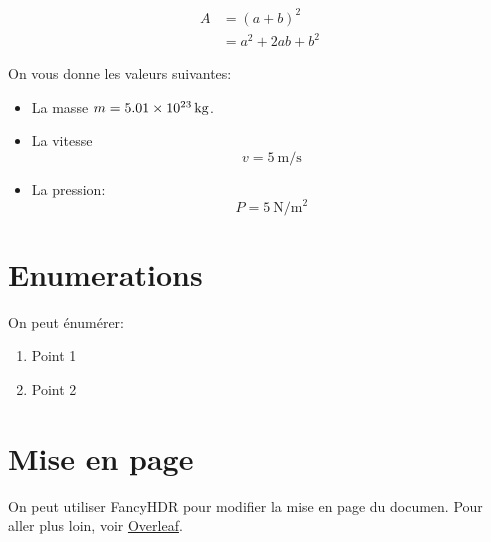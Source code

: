 \documentclass[10pt,a4paper,twoside]{article}
\begin{document}
\begin{align}
    A & = \left( a + b\right)^2 \nonumber \\
      & = a^2 + 2 ab + b^2
\end{align}

On vous donne les valeurs suivantes:
\begin{itemize}
\item La masse $m = \qty{5.01d23}{\kilo\gram}$.
\item La vitesse 
$$
v = \qty[per-mode=fraction]{5}{\meter\per\second}$$
\item La pression:
$$
P = \qty{5}{\newton\per\meter\squared}
$$
\end{itemize}

\section{Enumerations}

On peut énumérer:

\begin{enumerate}
\item Point 1
\item Point 2
\end{enumerate}

\section{Mise en page}

On peut utiliser FancyHDR pour modifier la mise en page du documen. 
Pour aller plus loin, voir \href{https://fr.overleaf.com/learn/latex/Headers_and_footers#Using_the_fancyhdr_package}{Overleaf}.
\end{document}
